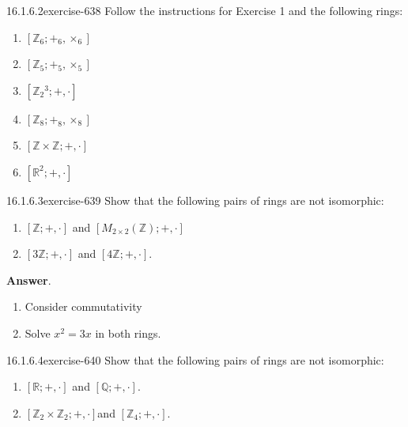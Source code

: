 \documentclass[twoside,10pt,]{book}
\numberwithin{equation}{section}
\begin{document}
\begin{divisionsolution}{16.1.6.2}{}{exercise-638}%
\hypertarget{p-5784}{}%
Follow the instructions for Exercise 1 and the following rings:\leavevmode%
\begin{multicols}{2}
\begin{enumerate}[label=(\alph*)]
\item\hypertarget{li-2543}{}\hypertarget{p-5785}{}%
\(\left[\mathbb{Z}_6;+_6,\times_6\right]\)%
\item\hypertarget{li-2544}{}\hypertarget{p-5786}{}%
\(\left[\mathbb{Z}_5;+_5,\times_5\right]\)%
\item\hypertarget{li-2545}{}\hypertarget{p-5787}{}%
\(\left[\mathbb{Z}_2{}^3;+,\cdot \right]\)%
\item\hypertarget{li-2546}{}\hypertarget{p-5788}{}%
\(\left[\mathbb{Z}_8; +_8 , \times_8 \right]\)%
\item\hypertarget{li-2547}{}\hypertarget{p-5789}{}%
\([\mathbb{Z} \times \mathbb{Z}; +, \cdot ]\)%
\item\hypertarget{li-2548}{}\hypertarget{p-5790}{}%
\(\left[\mathbb{R}^2; +, \cdot \right]\)%
\end{enumerate}
\end{multicols}
%
\end{divisionsolution}%
\begin{divisionsolution}{16.1.6.3}{}{exercise-639}%
\hypertarget{p-5791}{}%
Show that the following pairs of rings are not isomorphic:\leavevmode%
\begin{enumerate}[label=(\alph*)]
\item\hypertarget{li-2549}{}\hypertarget{p-5792}{}%
\([\mathbb{Z};+,\cdot ]\) and \(\left[M_{2\times 2}(\mathbb{Z});+,\cdot \right]\)%
\item\hypertarget{li-2550}{}\hypertarget{p-5793}{}%
\([3\mathbb{Z};+, \cdot ]\) and \([4\mathbb{Z};+, \cdot ]\).%
\end{enumerate}
%
\par\smallskip%
\noindent\textbf{Answer}.\quad%
\hypertarget{p-5794}{}%
\leavevmode%
\begin{enumerate}[label=(\alph*)]
\item\hypertarget{li-2551}{}\hypertarget{p-5795}{}%
Consider commutativity%
\item\hypertarget{li-2552}{}\hypertarget{p-5796}{}%
Solve \(x ^2=3x\) in both rings.%
\end{enumerate}
%
\end{divisionsolution}%
\begin{divisionsolution}{16.1.6.4}{}{exercise-640}%
\hypertarget{p-5797}{}%
Show that the following pairs of rings are not isomorphic:\leavevmode%
\begin{enumerate}[label=(\alph*)]
\item\hypertarget{li-2553}{}\hypertarget{p-5798}{}%
\([\mathbb{R}; +, \cdot ]\) and \([\mathbb{Q};+, \cdot ]\).%
\item\hypertarget{li-2554}{}\hypertarget{p-5799}{}%
\(\left[\mathbb{Z}_2 \times  \mathbb{Z}_2; +,\cdot \right]\)and \(\left[\mathbb{Z}_4; +, \cdot \right]\).%
\end{enumerate}
%
\end{divisionsolution}%
\end{document}
